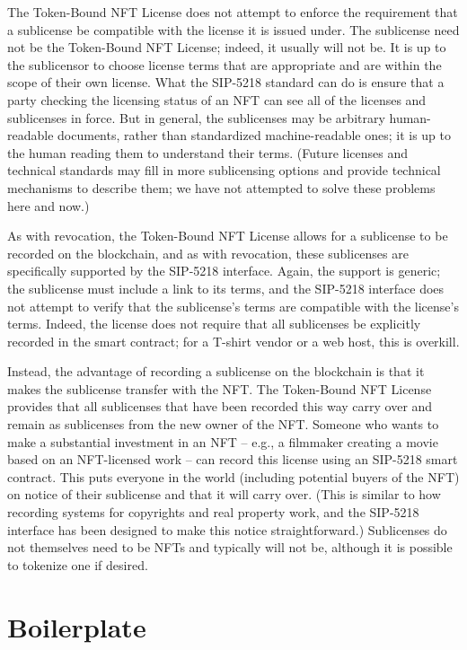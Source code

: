 \documentclass{article}
\newcommand{\eiplicense}{SIP-5218\xspace}
\newcommand{\iccclicense}{Token-Bound NFT License\xspace}
\begin{document}
The \iccclicense does not attempt to enforce the requirement that a sublicense be compatible with the license it is issued under. The sublicense need not be the \iccclicense; indeed, it usually will not be. It is up to the sublicensor to choose license terms that are appropriate and are within the scope of their own license. What the \eiplicense standard can do is ensure that a party checking the licensing status of an NFT can see all of the licenses and sublicenses in force. But in general, the sublicenses may be arbitrary human-readable documents, rather than standardized machine-readable ones; it is up to the human reading them to understand their terms. (Future licenses and technical standards may fill in more sublicensing options and provide technical mechanisms to describe them; we have not attempted to solve these problems here and now.)

As with revocation, the \iccclicense allows for a sublicense to be recorded on the blockchain, and as with revocation, these sublicenses are specifically supported by the \eiplicense interface. Again, the support is generic; the sublicense must include a link to its terms, and the \eiplicense interface does not attempt to verify that the sublicense's terms are compatible with the license's terms. Indeed, the license does not require that all sublicenses be explicitly recorded in the smart contract; for a T-shirt vendor or a web host, this is overkill. 

Instead, the advantage of recording a sublicense on the blockchain is that it makes the sublicense transfer with the NFT. The \iccclicense provides that all sublicenses that have been recorded this way carry over and remain as sublicenses from the new owner of the NFT. Someone who wants to make a substantial investment in an NFT -- e.g., a filmmaker creating a movie based on an NFT-licensed work -- can record this license using an \eiplicense smart contract. This puts everyone in the world (including potential buyers of the NFT) on notice of their sublicense and that it will carry over. (This is similar to how recording systems for copyrights and real property work, and the \eiplicense interface has been designed to make this notice straightforward.)  Sublicenses do not themselves need to be NFTs and typically will not be, although it is possible to tokenize one if desired.



\section{Boilerplate}
\end{document}
